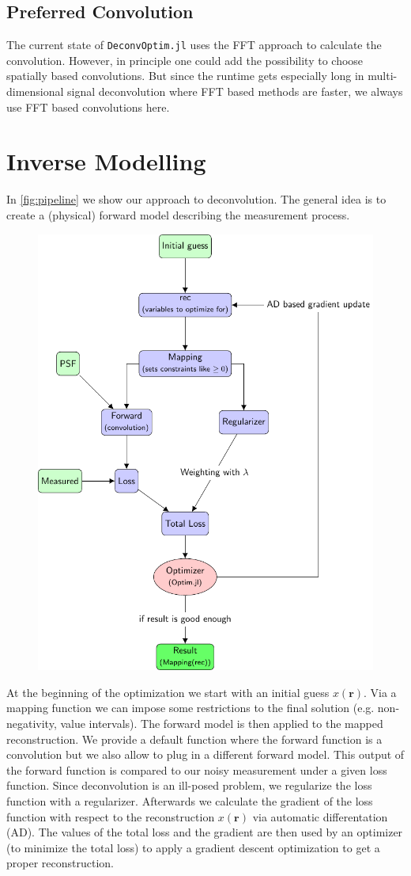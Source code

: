 \documentclass{juliacon}
\begin{document}
\subsection{Preferred Convolution}
The current state of \verb|DeconvOptim.jl| uses the FFT approach to calculate the convolution.
However, in principle one could add the possibility to choose spatially based convolutions.
But since the runtime gets especially long in multi-dimensional signal deconvolution where FFT based methods
are faster, we always use FFT based convolutions here. 
   
\section{Inverse Modelling}
In \autoref{fig:pipeline} we show our approach to deconvolution.
The general idea is to create a (physical) forward model describing the measurement process.
\begin{figure}[h]
    \centering
    \includegraphics[width = .5\textwidth]{figures/pipeline.pdf}
    \caption{}
    \label{fig:pipeline}
\end{figure}

At the beginning of the optimization we start with an initial guess $x(\mathbf r)$. 
Via a mapping function we can impose some restrictions to the final solution (e.g. non-negativity, value intervals).
The forward model is then applied to the mapped reconstruction. We provide a default function where 
the forward function is a convolution but we also allow to plug in a different forward model.
This output of the forward function is compared
to our noisy measurement under a given loss function.
Since deconvolution is an ill-posed problem, we regularize the loss function with a regularizer.
Afterwards we calculate the gradient of the loss function with respect to the reconstruction $x(\mathbf r)$ via automatic differentation (AD).
The values of the total loss and the gradient are then used by an optimizer (to minimize the total loss) to apply a gradient descent optimization to get a proper reconstruction.\\
\end{document}
